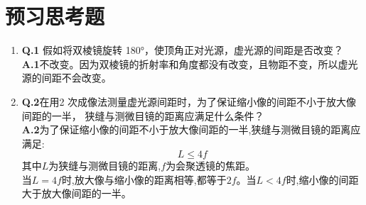 \documentclass[UTF8]{ctexart}
\begin{document}
\section{预习思考题}
\begin{enumerate}
    \item{\textbf{Q.1}} 假如将双棱镜旋转 180°，使顶角正对光源，虚光源的间距是否改变？\\ 
    \textbf{A.1}不改变。因为双棱镜的折射率和角度都没有改变，且物距不变，所以虚光源的间距不会改变。
    \item{\textbf{Q.2}}在用2 次成像法测量虚光源间距时，为了保证缩小像的间距不小于放大像间距的一半，
    狭缝与测微目镜的距离应满足什么条件？\\
    \textbf{A.2}为了保证缩小像的间距不小于放大像间距的一半,狭缝与测微目镜的距离应满足:
    $$L\leq 4f$$
    其中$L$为狭缝与测微目镜的距离,$f$为会聚透镜的焦距。\\
    当$L=4f$时,放大像与缩小像的距离相等,都等于$2f$。当$L<4f$时,缩小像的间距大于放大像间距的一半。

\end{enumerate}
\end{document}
